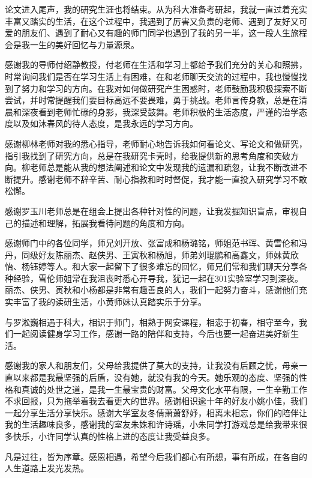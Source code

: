 

\begin{ack}
论文进入尾声，我的研究生涯也将结束。从为科大准备考研起，我就一直过着充实丰富又踏实的生活，在这个过程中，我遇到了厉害又负责的老师、遇到了友好又可爱的朋友们、遇到了耐心又有趣的师门同学也遇到了我的另一半，这一段人生旅程会是我一生的美好回忆与力量源泉。

感谢我的导师付绍静教授，付老师在生活和学习上都给予我们充分的关心和照拂，时常询问我们是否在学习生活上有困难，在和老师聊天交流的过程中，我也慢慢找到了努力和学习的方向。在我对如何做研究产生困惑时，老师鼓励我积极探索不断尝试，并时常提醒我们要目标高远不要畏难，勇于挑战。老师言传身教，总是在清晨和深夜看到老师忙碌的身影，我深受鼓舞。老师积极的生活态度，严谨的治学态度以及如沐春风的待人态度，是我永远的学习方向。

感谢柳林老师对我的悉心指导，老师耐心地告诉我如何看论文、写论文和做研究，指引我找到了研究方向，总是在我研究卡壳时，给我提供新的思考角度和突破方向。柳老师总是能从我的想法阐述和论文中发现我的遗漏和疏忽，让我不断改进不断提升。感谢老师不辞辛苦、耐心指教和时时督促，我才能一直投入研究学习不敢松懈。

感谢罗玉川老师总是在组会上提出各种针对性的问题，让我发掘知识盲点，审视自己的描述和理解，拓展我看待问题的角度和方向。

感谢师门中的各位同学，师兄刘开放、张富成和杨璐铭，师姐范书珲、黄雪伦和冯丹，同级好友陈丽杰、赵侠男、王寅秋和杨旭，师弟刘琨鹏和高鑫文，师妹黄欣怡、杨钰婷等人。和大家一起留下了很多难忘的回忆，师兄们常和我们聊天分享各种经验，雪伦师姐常在我沮丧时悉心开导我，犹记一起在301实验室学习到深夜。丽杰、侠男、寅秋和小杨都是非常有趣善良的人，我们一起努力奋斗，感谢他们充实丰富了我的读研生活，小黄师妹认真踏实乐于分享。

与罗淞巍相遇于科大，相识于师门，相熟于网安课程，相恋于初春，相守至今，我们一起阅读健身学习工作，感谢一路的陪伴和支持，今后也要一起奋进美好新生活。

感谢我的家人和朋友们，父母给我提供了莫大的支持，让我没有后顾之忧，母亲一直以来都是我最坚强的后盾，没有她，就没有我的今天。她乐观的态度、坚强的性格和真诚的处世之道，是我一生最宝贵的财富。父母文化水平有限，一生辛勤工作不求回报，只为拖举着我去看更大的世界。感谢相识逾十年的好友小姚小佳，我们一起分享生活分享快乐。感谢大学室友冬倩萧萧舒妤，相离未相忘，你们的陪伴让我的生活趣味良多，感谢我的室友朱姝和许诗瑶，小朱同学打游戏总是给我带来很多快乐，小许同学认真的性格上进的态度让我受益良多。

凡是过往，皆为序章。感恩相遇，希望今后我们都心有所想，事有所成，在各自的人生道路上发光发热。

\end{ack}

